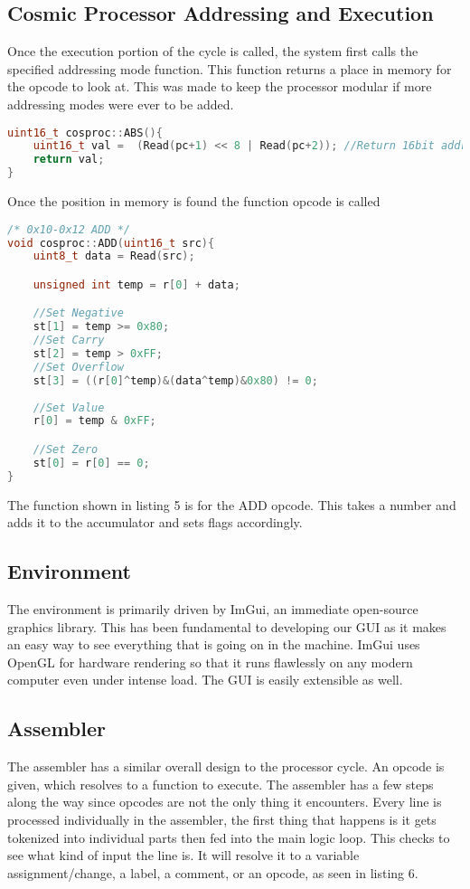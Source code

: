 \documentclass[conference]{IEEEtran}
\begin{document}
\subsection{Cosmic Processor Addressing and Execution}
Once the execution portion of the cycle is called, the system first calls the specified addressing mode function. This function returns a place in memory for the opcode to look at. This was made to keep the processor modular if more addressing modes were ever to be added.

\begin{lstlisting}[language=C++, caption=The Absolute Addressing Mode]
uint16_t cosproc::ABS(){
	uint16_t val =  (Read(pc+1) << 8 | Read(pc+2)); //Return 16bit address of where to look at data
	return val;
}
\end{lstlisting}

Once the position in memory is found the function opcode is called

\begin{lstlisting}[language=C++, caption=The ADD function]
/* 0x10-0x12 ADD */
void cosproc::ADD(uint16_t src){
	uint8_t data = Read(src);

	unsigned int temp = r[0] + data;

	//Set Negative
	st[1] = temp >= 0x80;
	//Set Carry
	st[2] = temp > 0xFF;
	//Set Overflow
	st[3] = ((r[0]^temp)&(data^temp)&0x80) != 0;
	
	//Set Value
	r[0] = temp & 0xFF;

	//Set Zero
	st[0] = r[0] == 0;
}
\end{lstlisting}

The function shown in listing 5 is for the ADD opcode. This takes a number and adds it to the accumulator and sets flags accordingly. 

\subsection{Environment}
The environment is primarily driven by ImGui, an immediate open-source graphics library. This has been fundamental to developing our GUI as it makes an easy way to see everything that is going on in the machine. ImGui uses OpenGL for hardware rendering so that it runs flawlessly on any modern computer even under intense load. The GUI is easily extensible as well.

\subsection{Assembler}
The assembler has a similar overall design to the processor cycle. An opcode is given, which resolves to a function to execute. The assembler has a few steps along the way since opcodes are not the only thing it encounters. Every line is processed individually in the assembler, the first thing that happens is it gets tokenized into individual parts then fed into the main logic loop. This checks to see what kind of input the line is. It will resolve it to a variable assignment/change, a label, a comment, or an opcode, as seen in listing 6.
\end{document}
